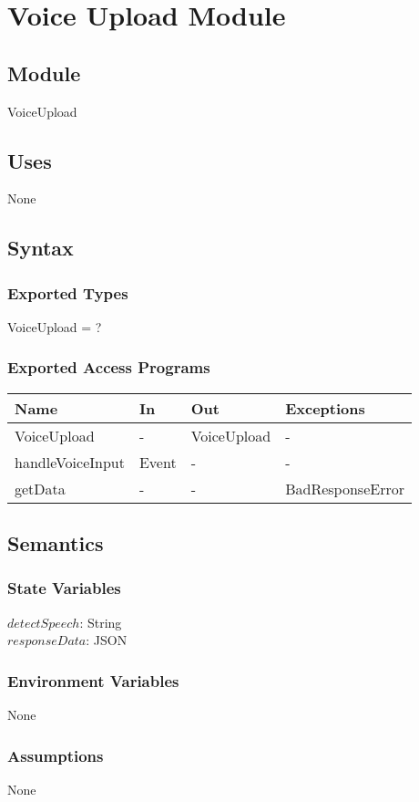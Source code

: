 \documentclass[12pt, titlepage]{article}
\begin{document}
\newpage

\section{Voice Upload Module} \label{VoiceUpload} 
\subsection{Module}
VoiceUpload
\subsection{Uses}
None
\subsection{Syntax}
\subsubsection{Exported Types}
VoiceUpload = ?
\subsubsection{Exported Access Programs}
\begin{center}
	\begin{tabular}{p{3cm} p{4cm} p{4cm} p{2cm}}
		\hline
		\textbf{Name} & \textbf{In} & \textbf{Out} & \textbf{Exceptions} \\
		\hline
		VoiceUpload & - & VoiceUpload & - \\
		handleVoiceInput & Event & - & - \\
		getData & - & - & BadResponseError \\
		\hline
	\end{tabular}
\end{center}
\subsection{Semantics}
\subsubsection{State Variables}
$ detectSpeech $: String\\
$responseData$: JSON
\subsubsection{Environment Variables}
None
\subsubsection{Assumptions}
None
\end{document}
